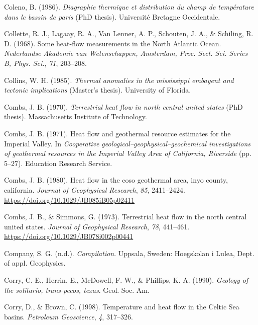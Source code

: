 \documentclass[draft,linenumbers]{agujournal2018}
\begin{document}
\leavevmode{}%
Coleno, B. (1986). \emph{Diagraphie thermique et distribution du champ
de température dans le bassin de paris} (PhD thesis). Université
Bretagne Occidentale.

\leavevmode{}%
Collette, R. J., Lagaay, R. A., Van Lenner, A. P., Schouten, J. A., \&
Schiling, R. D. (1968). Some heat-flow measurements in the {North
Atlantic Ocean}. \emph{{Nederlandse Akademie van Wetenschappen,
Amsterdam}, Proc. Sect. Sci. Series B, Phys. Sci.}, \emph{71}, 203--208.

\leavevmode{}%
Collins, W. H. (1985). \emph{Thermal anomalies in the mississippi
embayent and tectonic implications} (Master's thesis). University of
Florida.

\leavevmode{}%
Combs, J. B. (1970). \emph{Terrestrial heat flow in north central united
states} (PhD thesis). Massachusetts Institute of Technology.

\leavevmode{}%
Combs, J. B. (1971). Heat flow and geothermal resource estimates for the
{Imperial Valley}. In \emph{Cooperative
geological--geophysical--geochemical investigations of geothermal
resources in the {Imperial Valley Area of California, Riverside}} (pp.
5--27). Education Research Service.

\leavevmode{}%
Combs, J. B. (1980). Heat flow in the coso geothermal area, inyo county,
california. \emph{Journal of Geophysical Research}, \emph{85},
2411--2424. \url{https://doi.org/10.1029/JB085iB05p02411}

\leavevmode{}%
Combs, J. B., \& Simmons, G. (1973). Terrestrial heat flow in the north
central united states. \emph{Journal of Geophysical Research},
\emph{78}, 441--461. \url{https://doi.org/10.1029/JB078i002p00441}

\leavevmode{}%
Company, S. G. (n.d.). \emph{Compilation}. Uppsala, Sweden: Hoegskolan i
Lulea, Dept. of appl. Geophysics.

\leavevmode{}%
Corry, C. E., Herrin, E., McDowell, F. W., \& Phillips, K. A. (1990).
\emph{Geology of the solitario, trans-pecos, texas}. Geol. Soc. Am.

\leavevmode{}%
Corry, D., \& Brown, C. (1998). Temperature and heat flow in the {Celtic
Sea} basins. \emph{Petroleum Geoscience}, \emph{4}, 317--326.
\end{document}
